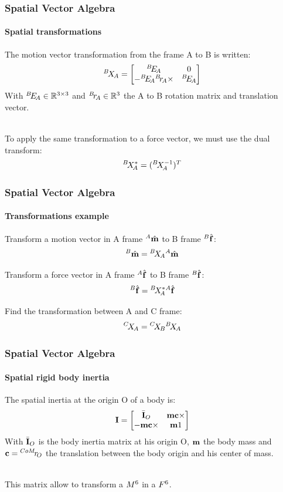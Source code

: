 \documentclass{beamer}
\begin{document}
  	\begin{frame}
		\frametitle{Spatial Vector Algebra}
		\framesubtitle{Spatial transformations}
		The motion vector transformation from the frame A to B is written:
		$$
		\transform{A}{B} = \begin{bmatrix} \rotation{A}{B} & 0 \\ -\rotation{A}{B} \translation{A}{B} \times & \rotation{A}{B} \end{bmatrix}
		$$
		With $ \rotation{A}{B} \in \mathbb{R}^{3{\times}3} $ and $ \translation{A}{B} \in \mathbb{R}^{3} $ the A to B rotation matrix and translation vector.

		\hfill \\
		To apply the same transformation to a force vector, we must use the dual transform:
		$$
		\transformDual{A}{B} = (\transformInv{A}{B})^T
		$$
	\end{frame}


  	\begin{frame}
		\frametitle{Spatial Vector Algebra}
		\framesubtitle{Transformations example}
		Transform a motion vector in A frame $ \motionvecHatFrame{A} $ to B frame $ \forcevecHatFrame{B} $:
		$$
		\motionvecHatFrame{B} = \transform{A}{B} \motionvecHatFrame{A}
		$$

		Transform a force vector in A frame $ \forcevecHatFrame{A} $ to B frame $ \forcevecHatFrame{B} $:
		$$
		\forcevecHatFrame{B} = \transformDual{A}{B} \forcevecHatFrame{A}
		$$

		Find the transformation between A and C frame:
		$$
		\transform{A}{C} = \transform{B}{C}\transform{A}{B}
		$$
	\end{frame}


  	\begin{frame}
		\frametitle{Spatial Vector Algebra}
		\framesubtitle{Spatial rigid body inertia}
		The spatial inertia at the origin O of a body is:
		$$
		\inertia = \begin{bmatrix} \inertiaBarOrigin{O} & \mass \bodycom \times \\ -\mass \bodycom \times & \mass1 \end{bmatrix}
		$$
		With $ \inertiaBarOrigin{O} $ is the body inertia matrix at his origin O, $ \mass $ the body mass and $ \bodycom = \translation{O}{{CoM}} $ the translation between the body origin and his center of mass.

		\hfill \\
		This matrix allow to transform a $ \motionspace{6} $ in a $ \forcespace{6} $.
	\end{frame}
\end{document}

